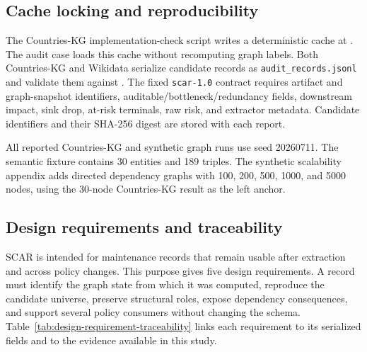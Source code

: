 \documentclass[pdflatex,sn-basic]{sn-jnl}
\begin{document}
\subsection{Cache locking and reproducibility}

The Countries-KG implementation-check script writes a deterministic cache at . The audit case loads this cache without recomputing graph labels. Both Countries-KG and Wikidata serialize candidate records as \texttt{audit\_records.jsonl} and validate them against . The fixed \texttt{scar-1.0} contract requires artifact and graph-snapshot identifiers, auditable/bottleneck/redundancy fields, downstream impact, sink drop, at-risk terminals, raw risk, and extractor metadata. Candidate identifiers and their SHA-256 digest are stored with each report.

All reported Countries-KG and synthetic graph runs use seed 20260711. The semantic fixture contains 30 entities and 189 triples. The synthetic scalability appendix adds directed dependency graphs with 100, 200, 500, 1000, and 5000 nodes, using the 30-node Countries-KG result as the left anchor.

\FloatBarrier
\subsection{Design requirements and traceability}

SCAR is intended for maintenance records that remain usable after extraction and across policy changes. This purpose gives five design requirements. A record must identify the graph state from which it was computed, reproduce the candidate universe, preserve structural roles, expose dependency consequences, and support several policy consumers without changing the schema. Table~\ref{tab:design-requirement-traceability} links each requirement to its serialized fields and to the evidence available in this study.
\end{document}
